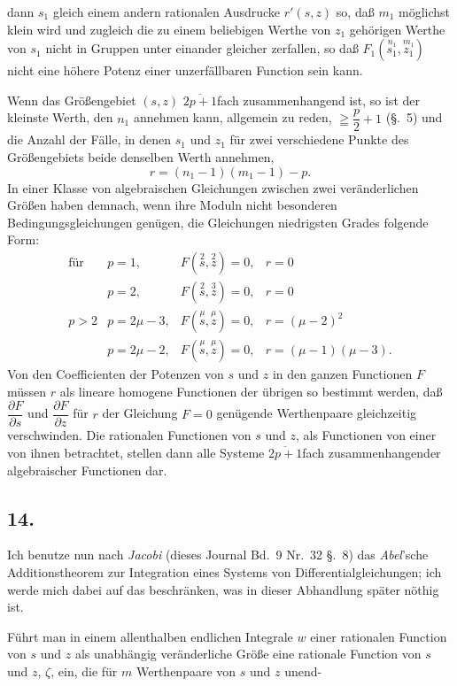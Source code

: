 \documentclass{article}
\begin{document}
dann $s_{1}$ gleich einem andern rationalen Ausdrucke $r'(s, z)$ so, daß $m_{1}$ möglichst klein wird und zugleich die zu einem beliebigen Werthe von $z_{1}$ gehörigen Werthe von $s_{1}$ nicht in Gruppen unter einander gleicher zerfallen, so daß $F_{1}(\overset{n_{1}}{s_{1}}, \overset{m_{1}}{z_{1}})$ nicht eine höhere Potenz einer unzerfällbaren Function sein kann.

Wenn das Größengebiet $(s, z)$ $\overline{2p+1}$fach zusammenhangend ist, so ist der kleinste Werth, den $n_{1}$ annehmen kann, allgemein zu reden, $\geqq \dfrac{p}{2} + 1$ (§.~5) und die Anzahl der Fälle, in denen $s_{1}$ und $z_{1}$ für zwei verschiedene Punkte des Größengebiets beide denselben Werth annehmen,
\[ r = (n_{1}-1)(m_{1}-1) - p. \]
In einer Klasse von algebraischen Gleichungen zwischen zwei veränderlichen Größen haben demnach, wenn ihre Moduln nicht besonderen Bedingungsgleichungen genügen, die Gleichungen niedrigsten Grades folgende Form:
\[
\begin{array}{llll}
\text{für} & p = 1, & F(\overset{2}{s}, \overset{2}{z}) = 0, & r = 0 \\
 & p = 2, & F(\overset{2}{s}, \overset{3}{z}) = 0, & r = 0 \\
p > 2 & p = 2\mu-3, & F(\overset{\mu}{s}, \overset{\mu}{z}) = 0, & r = (\mu-2)^{2} \\
 & p = 2\mu-2, & F(\overset{\mu}{s}, \overset{\mu}{z}) = 0, & r = (\mu-1)(\mu-3).
\end{array}
\]
Von den Coefficienten der Potenzen von $s$ und $z$ in den ganzen Functionen $F$ müssen $r$ als lineare homogene Functionen der übrigen so bestimmt werden, daß $\dfrac{\partial F}{\partial s}$ und $\dfrac{\partial F}{\partial z}$ für $r$ der Gleichung $F = 0$ genügende Werthenpaare gleichzeitig verschwinden. Die rationalen Functionen von $s$ und $z$, als Functionen von einer von ihnen betrachtet, stellen dann alle Systeme $\overline{2p+1}$fach zusammenhangender algebraischer Functionen dar.

\subsection*{14.}

Ich benutze nun nach \emph{Jacobi} (dieses Journal Bd.~9 Nr.~32 §.~8) das \emph{Abel}'sche Additionstheorem zur Integration eines Systems von Differentialgleichungen; ich werde mich dabei auf das beschränken, was in dieser Abhandlung später nöthig ist.

Führt man in einem allenthalben endlichen Integrale $w$ einer rationalen Function von $s$ und $z$ als unabhängig veränderliche Größe eine rationale Function von $s$ und $z$, $\zeta$, ein, die für $m$ Werthenpaare von $s$ und $z$ unend-
\end{document}
